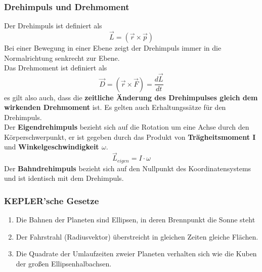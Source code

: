 \documentclass[12pt,a4paper,ngerman]{article}
\begin{document}
\pagebreak


\subsubsection*{Drehimpuls und Drehmoment}
Der Drehimpuls ist definiert als
\begin{equation}
\vec{L} = (\vec{r} \times \vec{p})
\end{equation}
Bei einer Bewegung in einer Ebene zeigt der Drehimpuls immer in die Normalrichtung senkrecht zur Ebene. \\

Das Drehmoment ist definiert als
\begin{equation}
\vec{D} = (\vec{r} \times \vec{F}) = \frac{d\vec{L}}{dt}
\end{equation}
es gilt also auch, dass die \textbf{zeitliche Änderung des Drehimpulses gleich dem wirkenden Drehmoment} ist. Es gelten auch Erhaltungssätze für den Drehimpuls. \\
Der \textbf{Eigendrehimpuls} bezieht sich auf die Rotation um eine Achse durch den Körperschwerpunkt, er ist gegeben durch das Produkt von \textbf{Trägheitsmoment I} und \textbf{Winkelgeschwindigkeit $\omega$}. 
\begin{equation}
\vec{L}_{eigen} = I \cdot \omega
\end{equation}
Der \textbf{Bahndrehimpuls} bezieht sich auf den Nullpunkt des Koordinatensystems und ist identisch mit dem Drehimpuls. 

\subsubsection*{KEPLER'sche Gesetze}

\begin{enumerate}
\item Die Bahnen der Planeten sind Ellipsen, in deren Brennpunkt die Sonne steht \\
\item Der Fahrstrahl (Radiusvektor) überstreicht in gleichen Zeiten gleiche Flächen. \\
\item Die Quadrate der Umlaufzeiten zweier Planeten verhalten sich wie die Kuben der großen Ellipsenhalbachsen. 
\end{enumerate}
\end{document}
